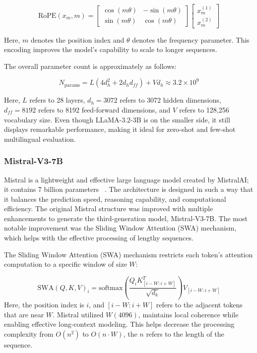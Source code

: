 \documentclass[10pt,letterpaper]{article}
\begin{document}
\begin{equation}
\text{RoPE}(x_m,m)=
\begin{bmatrix}
\cos(m\theta)&-\sin(m\theta)\\
\sin(m\theta)&\cos(m\theta)
\end{bmatrix}
\begin{bmatrix}
x_m^{(1)}\\
x_m^{(2)}
\end{bmatrix}
\label{eq:rope}
\end{equation}

Here, \(m\) denotes the position index and \(\theta\) denotes the frequency parameter. This encoding improves the model’s capability to scale to longer sequences. 

The overall parameter count is approximately as follows: 

\begin{equation}
N_{\text{params}} = L(4d_h^2 + 2d_h d_{ff}) + V d_h \approx 3.2\times10^9
\label{eq:llama_params}
\end{equation}

Here, \(L\) refers to 28 layers, \(d_h=3072\) refers to 3072 hidden dimensions, \(d_{ff}=8192\) refers to 8192 feed-forward dimensions, and \(V\) refers to 128,256 vocabulary size. Even though LLaMA-3.2-3B is on the smaller side, it still displays remarkable performance, making it ideal for zero-shot and few-shot multilingual evaluation. 

\subsubsection*{Mistral-V3-7B}
Mistral is a lightweight and effective large language model created by MistralAI; it contains 7 billion parameters ~\cite{b37}. The architecture is designed in such a way that it balances the prediction speed, reasoning capability, and computational efficiency. The original Mistral structure was improved with multiple enhancements to generate the third-generation model, Mistral-V3-7B. The most notable improvement was the Sliding Window Attention  (SWA) mechanism, which helps with the effective processing of lengthy sequences. 

The Sliding Window Attention (SWA) mechanism restricts each token’s attention computation to a specific window of size \(W\):

\begin{equation}
\text{SWA}(Q,K,V)_i = \text{softmax}\!\left(\frac{Q_iK_{[i-W:i+W]}^{T}}{\sqrt{d_k}}\right)V_{[i-W:i+W]}
\label{eq:swa}
\end{equation}
Here, the position index is \(i\), and \([i-W:i+W]\) refers to the adjacent tokens that are near \(W\). Mistral utilized \(W (4096)\), maintains local coherence while enabling effective long-context modeling. This helps decrease the processing complexity from \(O(n^2)\) to \(O(n \cdot W)\), the \(n\) refers to the length of the sequence.
\end{document}
